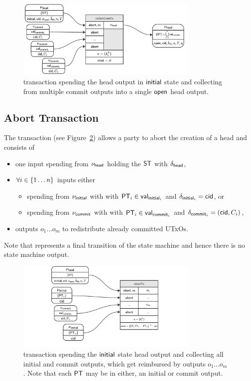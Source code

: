 \begin{figure}[h]
	\centering
	\includegraphics[width=0.8\textwidth]{figures/collectComTx.pdf}
	\caption{\mtxCCom{} transaction spending the head output in $\mathsf{initial}$
		state and collecting from multiple commit outputs into a single
		$\mathsf{open}$ head output.}\label{fig:collectComTx}
\end{figure}

\subsection{Abort Transaction}\label{sec:abort-tx}

The \mtxAbort{} transaction (see Figure~\ref{fig:abortTx}) allows a
party to abort the creation of a head and consists of
\begin{itemize}
	\item one input spending from $\nu_\mathsf{head}$ holding the $\mathsf{ST}$ with $\delta_{\mathsf{head}}$,
	\item $\forall i \in \{1 \dots n\}$ inputs either
	      \begin{itemize}
		      \item spending from $\nu_{\mathsf{initial}}$ with with $\mathsf{PT}_{i} \in \mathsf{val}_{\mathsf{initial}_{i}}$ and $\delta_{\mathsf{initial}_{i}} = \mathsf{cid}$, or
		      \item spending from $\nu_{\mathsf{commit}}$ with with $\mathsf{PT}_{i} \in \mathsf{val}_{\mathsf{commit}_{i}}$ and $\delta_{\mathsf{commit}_{i}} = (\mathsf{cid}, C_{i})$,
	      \end{itemize}
	\item outputs $o_{1} \dots o_{m}$ to redistribute already committed UTxOs.
\end{itemize}

Note that \mtxAbort{} represents a final transition of the state
machine and hence there is no state machine output.

\begin{figure}[h]
	\centering
	\includegraphics[width=0.8\textwidth]{figures/abortTx.pdf}
	\caption{\mtxAbort{} transaction spending the $\mathsf{initial}$ state head
		output and collecting all initial and commit outputs, which get reimbursed
		by outputs $o_{1} \dots o_{m}$. Note that each $\mathsf{PT}$ may be in either, an
		initial or commit output.}\label{fig:abortTx}
\end{figure}

